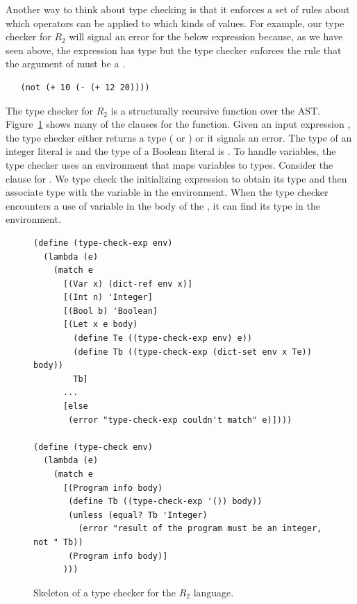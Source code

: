 \documentclass[11pt]{book}
\begin{document}
Another way to think about type checking is that it enforces a set of
rules about which operators can be applied to which kinds of
values. For example, our type checker for $R_2$ will signal an error
for the below expression because, as we have seen above, the
expression  has type  but the type
checker enforces the rule that the argument of  must be a
.
\begin{lstlisting}
   (not (+ 10 (- (+ 12 20))))
\end{lstlisting}

The type checker for $R_2$ is a structurally recursive function over
the AST. Figure~\ref{fig:type-check-R2} shows many of the clauses for
the  function.  Given an input expression
, the type checker either returns a type ( or
) or it signals an error.  The type of an integer literal
is  and the type of a Boolean literal is .
To handle variables, the type checker uses an environment that maps
variables to types. Consider the clause for .  We type check
the initializing expression to obtain its type  and then
associate type  with the variable  in the
environment. When the type checker encounters a use of variable
 in the body of the , it can find its type in the
environment.

\begin{figure}[tbp]
\begin{lstlisting}
(define (type-check-exp env)
  (lambda (e)
    (match e
      [(Var x) (dict-ref env x)]
      [(Int n) 'Integer]
      [(Bool b) 'Boolean]
      [(Let x e body)
        (define Te ((type-check-exp env) e))
        (define Tb ((type-check-exp (dict-set env x Te)) body))
        Tb]
      ...
      [else
       (error "type-check-exp couldn't match" e)])))

(define (type-check env)
  (lambda (e)
    (match e
      [(Program info body)
       (define Tb ((type-check-exp '()) body))
       (unless (equal? Tb 'Integer)
         (error "result of the program must be an integer, not " Tb))
       (Program info body)]
      )))
\end{lstlisting}
\caption{Skeleton of a type checker for the $R_2$ language.}
\label{fig:type-check-R2}
\end{figure}
\end{document}
